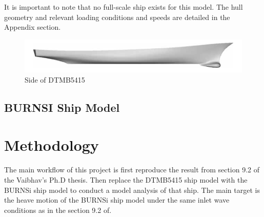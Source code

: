 \documentclass[12pt]{article} %
\begin{document}
It is important to note that no full-scale ship exists for this model. The hull geometry and relevant loading conditions and speeds are detailed in the Appendix section.
\begin{figure}[ht]
    \centering
    \includegraphics[width=1\textwidth]{DTMB.png}
    \caption{Side of DTMB5415}
\end{figure}


\subsection{BURNSI Ship Model}

\section{Methodology}
The main workflow of this project is first reproduce the result from section 9.2 of the Vaibhav's Ph.D thesis\cite{joshi2018}. 
Then replace the DTMB5415 ship model with the BURNSi ship model to conduct a model analysis of that ship. The main target is the
heave motion of the BURNSi ship model under the same inlet wave conditions as in the section 9.2 of\cite{joshi2018}.
\end{document}
